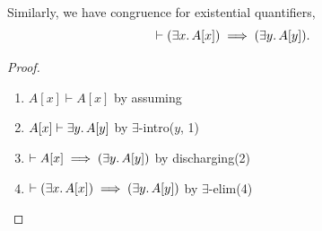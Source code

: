 \begin{node}
Similarly, we have congruence for existential quantifiers,
\begin{equation*}
\vdash(\exists x\ldotp A[x])\implies(\exists y\ldotp A[y]).
\end{equation*}
\end{node}

\begin{proof}
\begin{enumerate}
\item $A[x]\vdash A[x]$ by assuming%
\item $A[x]\vdash\exists y\ldotp A[y]$ by $\exists$-intro($y$, 1)%
\item $\vdash A[x]\implies(\exists y\ldotp A[y])$ by discharging(2)%
\item $\vdash(\exists x\ldotp A[x])\implies(\exists y\ldotp A[y])$
  by $\exists$-elim(4)\qedhere
\end{enumerate}
\end{proof}

